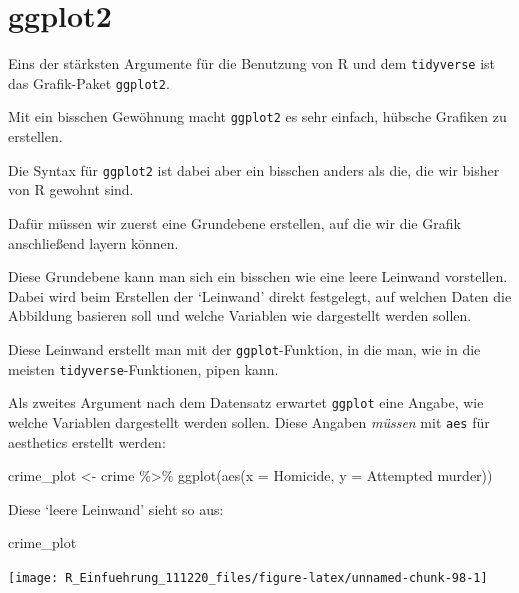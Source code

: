 \documentclass[
]{book}
\newenvironment{Shaded}{\begin{snugshade}}{\end{snugshade}}
\newcommand{\AttributeTok}[1]{\textcolor[rgb]{0.77,0.63,0.00}{#1}}
\newcommand{\FunctionTok}[1]{\textcolor[rgb]{0.00,0.00,0.00}{#1}}
\newcommand{\NormalTok}[1]{#1}
\newcommand{\OtherTok}[1]{\textcolor[rgb]{0.56,0.35,0.01}{#1}}
\newcommand{\SpecialCharTok}[1]{\textcolor[rgb]{0.00,0.00,0.00}{#1}}
\newcommand{\StringTok}[1]{\textcolor[rgb]{0.31,0.60,0.02}{#1}}
\begin{document}
\hypertarget{ggplot2}{%
\section{ggplot2}\label{ggplot2}}

Eins der stärksten Argumente für die Benutzung von R und dem \texttt{tidyverse} ist das Grafik-Paket \texttt{ggplot2}.

Mit ein bisschen Gewöhnung macht \texttt{ggplot2} es sehr einfach, hübsche Grafiken zu erstellen.

Die Syntax für \texttt{ggplot2} ist dabei aber ein bisschen anders als die, die wir bisher von R gewohnt sind.

Dafür müssen wir zuerst eine Grundebene erstellen, auf die wir die Grafik anschließend layern können.

Diese Grundebene kann man sich ein bisschen wie eine leere Leinwand vorstellen.
Dabei wird beim Erstellen der `Leinwand' direkt festgelegt, auf welchen Daten die Abbildung basieren soll und welche Variablen wie dargestellt werden sollen.

Diese Leinwand erstellt man mit der \texttt{ggplot}-Funktion, in die man, wie in die meisten \texttt{tidyverse}-Funktionen, pipen kann.

Als zweites Argument nach dem Datensatz erwartet \texttt{ggplot} eine Angabe, wie welche Variablen dargestellt werden sollen. Diese Angaben \emph{müssen} mit \texttt{aes} für aesthetics erstellt werden:

\begin{Shaded}
\begin{Highlighting}[]
\NormalTok{crime\_plot }\OtherTok{\textless{}{-}}\NormalTok{ crime }\SpecialCharTok{\%\textgreater{}\%} 
  \FunctionTok{ggplot}\NormalTok{(}\FunctionTok{aes}\NormalTok{(}\AttributeTok{x =}\NormalTok{ Homicide, }\AttributeTok{y =} \StringTok{\textasciigrave{}}\AttributeTok{Attempted murder}\StringTok{\textasciigrave{}}\NormalTok{))}
\end{Highlighting}
\end{Shaded}

Diese `leere Leinwand' sieht so aus:

\begin{Shaded}
\begin{Highlighting}[]
\NormalTok{crime\_plot}
\end{Highlighting}
\end{Shaded}

\begin{center}\texttt{[image: R\_Einfuehrung\_111220\_files/figure-latex/unnamed-chunk-98-1]} \end{center}
\end{document}

